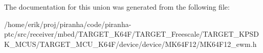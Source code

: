 The documentation for this union was generated from the following file\+:\begin{DoxyCompactItemize}
\item 
/home/erik/proj/piranha/code/piranha-\/ptc/src/receiver/mbed/\+T\+A\+R\+G\+E\+T\+\_\+\+K64\+F/\+T\+A\+R\+G\+E\+T\+\_\+\+Freescale/\+T\+A\+R\+G\+E\+T\+\_\+\+K\+P\+S\+D\+K\+\_\+\+M\+C\+U\+S/\+T\+A\+R\+G\+E\+T\+\_\+\+M\+C\+U\+\_\+\+K64\+F/device/device/\+M\+K64\+F12/M\+K64\+F12\+\_\+ewm.\+h\end{DoxyCompactItemize}
